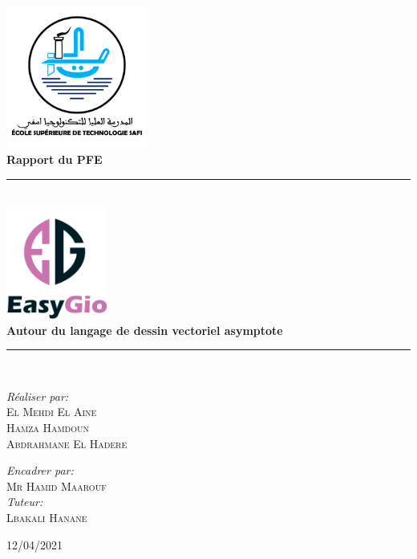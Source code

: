 \documentclass[a4paper]{report}
\newcommand{\HRule}{\rule{\linewidth}{0.5mm}}
\begin{document}
\begin{titlepage}
\begin{center}

\includegraphics[width=0.35\textwidth]{./images/ESTS_logo.png}~\\[2cm]
{\huge \bfseries Rapport du PFE}\\[0.4cm]
\HRule \\[0.4cm]
{\huge \bfseries \includegraphics[width=0.25\textwidth]{./images/logo.png}~\\[0.5cm]
Autour du langage de dessin vectoriel asymptote} \\[0.4cm]
\HRule \\[1.5cm]
\begin{minipage}{0.4\textwidth}
\begin{flushleft} \large
\emph{Réaliser par:}\\
\textsc{El Mehdi El Aine}\\
\textsc{Hamza Hamdoun}\\
\textsc{Abdrahmane El Hadere}\\
\end{flushleft}
\end{minipage}
\begin{minipage}{0.4\textwidth}
\begin{flushright} \large
\emph{Encadrer par:} \\
\textsc{Mr Hamid Maarouf}\\
\emph{Tuteur:} \\
\textsc{Lbakali Hanane}\\
\end{flushright}
\end{minipage}
\vfill
{\large 12/04/2021}
\end{center}
\end{titlepage}
\end{document}
